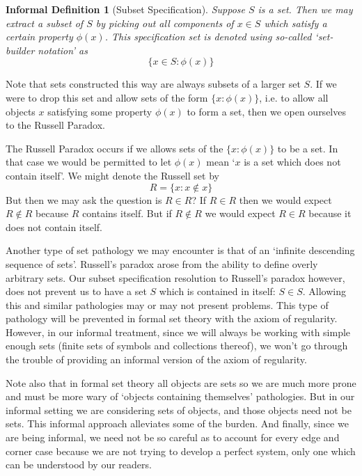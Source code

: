 \documentclass[12pt]{article}
\theoremstyle{break}
\theoremstyle{break}
\theoremstyle{break}
\theoremstyle{break}
\theoremstyle{break}
\newtheorem{informal definition}[definition]{Informal Definition}
\begin{document}
\begin{informal definition}[Subset Specification]
Suppose $S$ is a set.
Then we may extract a subset of $S$ by picking out all components of $x\in S$ which satisfy a certain property $\phi(x)$.
This specification set is denoted using so-called `set-builder notation' as
$$
\{x\in S: \phi(x)\}
$$
\end{informal definition}

Note that sets constructed this way are always subsets of a larger set $S$.
If we were to drop this set and allow sets of the form $\{x:\phi(x)\}$, i.e. to allow all objects $x$ satisfying some property $\phi(x)$ to form a set, then we open ourselves to the Russell Paradox.

The Russell Paradox occurs if we allows sets of the $\{x:\phi(x)\}$ to be a set.
In that case we would be permitted to let $\phi(x)$ mean `$x$ is a set which does not contain itself'.
We might denote the Russell set by
$$
R = \{x: x \not \in x\}
$$
But then we may ask the question is $R\in R$?
If $R\in R$ then we would expect $R\not \in R$ because $R$ contains itself.
But if $R\not \in R$ we would expect $R\in R$ because it does not contain itself.

Another type of set pathology we may encounter is that of an `infinite descending sequence of sets'.
Russell's paradox arose from the ability to define overly arbitrary sets.
Our subset specification resolution to Russell's paradox however, does not prevent us to have a set $S$ which is  contained in itself: $S\in S$.
Allowing this and similar pathologies may or may not present problems.
This type of pathology will be prevented in formal set theory with the axiom of regularity.
However, in our informal treatment, since we will always be working with simple enough sets (finite sets of symbols and collections thereof), we won't go through the trouble of providing an informal version of the axiom of regularity.

Note also that in formal set theory all objects are sets so we are much more prone and must be more wary of `objects containing themselves' pathologies.
But in our informal setting we are considering sets of objects, and those objects need not be sets.
This informal approach alleviates some of the burden.
And finally, since we are being informal, we need not be so careful as to account for every edge and corner case because we are not trying to develop a perfect system, only one which can be understood by our readers.
\end{document}
